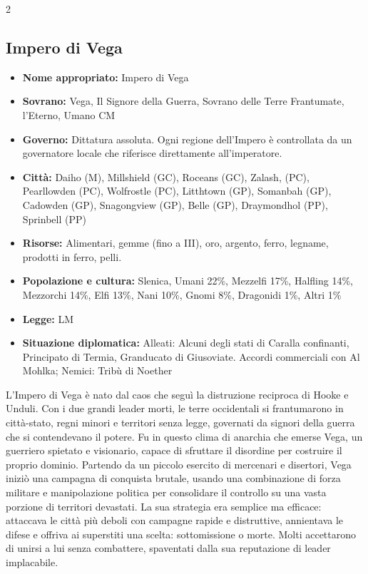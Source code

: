 \documentclass[10pt, a4paper]{report}
\begin{document}
\begin{multicols}{2}
\subsection*{Impero di Vega}
\begin{itemize}
	\item \textbf{Nome appropriato:} Impero di Vega
	\item \textbf{Sovrano:} Vega, Il Signore della Guerra, Sovrano delle Terre Frantumate, l'Eterno, Umano CM
	\item \textbf{Governo:} Dittatura assoluta. Ogni regione dell’Impero è controllata da un governatore locale che riferisce direttamente all'imperatore.
	\item \textbf{Città:} Daiho (M), Millshield (GC), Roceans (GC), Zalash, (PC), Pearllowden (PC), Wolfrostle (PC), Litthtown (GP), Somanbah (GP), Cadowden (GP), Snagongview (GP), Belle (GP), Draymondhol (PP), Sprinbell (PP)
	\item \textbf{Risorse:} Alimentari, gemme (fino a III), oro, argento, ferro, legname, prodotti in ferro, pelli.
	\item \textbf{Popolazione e cultura:} Slenica, Umani 22\%, Mezzelfi 17\%, Halfling 14\%, Mezzorchi 14\%, Elfi 13\%, Nani 10\%, Gnomi 8\%, Dragonidi 1\%, Altri 1\%
	\item \textbf{Legge:} LM
	\item \textbf{Situazione diplomatica:} Alleati: Alcuni degli stati di Caralla confinanti, Principato di Termia, Granducato di Giusoviate. Accordi commerciali con Al Mohlka; Nemici: Tribù di Noether	
\end{itemize}
L’Impero di Vega è nato dal caos che seguì la distruzione reciproca di Hooke e Unduli. Con i due grandi leader morti, le terre occidentali si frantumarono in città-stato, regni minori e territori senza legge, governati da signori della guerra che si contendevano il potere. Fu in questo clima di anarchia che emerse Vega, un guerriero spietato e visionario, capace di sfruttare il disordine per costruire il proprio dominio. Partendo da un piccolo esercito di mercenari e disertori, Vega iniziò una campagna di conquista brutale, usando una combinazione di forza militare e manipolazione politica per consolidare il controllo su una vasta porzione di territori devastati. La sua strategia era semplice ma efficace: attaccava le città più deboli con campagne rapide e distruttive, annientava le difese e offriva ai superstiti una scelta: sottomissione o morte. Molti accettarono di unirsi a lui senza combattere, spaventati dalla sua reputazione di leader implacabile.

\end{multicols}
\end{document}
